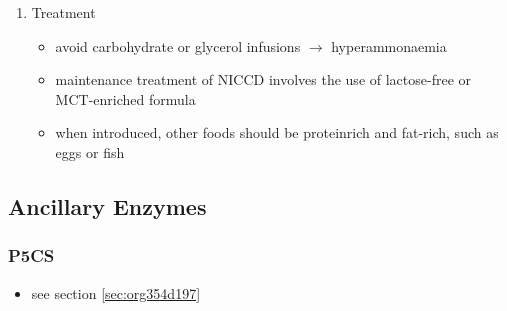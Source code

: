 \documentclass{scrartcl}
\begin{document}
\begin{enumerate}
\item Treatment
\label{sec:org9848db2}
\begin{itemize}
\item avoid carbohydrate or glycerol infusions \(\to\) hyperammonaemia
\item maintenance treatment of NICCD involves the use of lactose-free or
MCT-enriched formula
\item when introduced, other foods should be proteinrich and fat-rich,
such as eggs or fish
\end{itemize}
\end{enumerate}
\subsection{Ancillary Enzymes}
\label{sec:orge671532}
\subsubsection{P5CS}
\label{sec:org70008ca}
\begin{itemize}
\item see section \ref{sec:org354d197}
\end{itemize}
\end{document}
